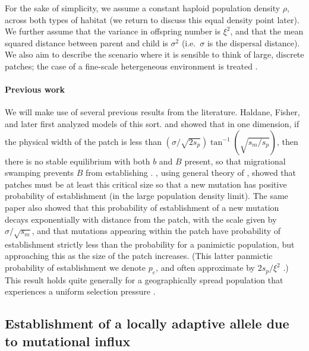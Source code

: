 \documentclass{article}
\begin{document}
For the sake of simplicity, we assume a constant haploid population density $\rho$, 
across both types of habitat (we return to discuss this equal density point later). 
We further assume that the variance in offspring number is $\xi^2$, 
and that the mean squared distance between parent and child is $\sigma^2$
(i.e.\ $\sigma$ is the dispersal distance).
We also aim to describe the scenario where it is sensible to think of large, discrete patches;
the case of a fine-scale hetergeneous environment is treated \citep{elsewhere}.

\paragraph{Previous work} 
We will make use of several previous results from the literature. 
Haldane, Fisher, and later \citet{slatkin1973geneflow} first analyzed models of this sort.
\citet{nagylaki1975conditions} and \citet{conley1975application} showed that in one dimension, if the physical width of the patch is less than $(\sigma/\sqrt{2s_p}) \tan^{-1} (\sqrt{s_m/s_p})$, 
then there is no stable equilibrium with both $b$ and $B$ present,  %
so that migrational swamping prevents $B$ from establishing \citep[see also][ for a review]{lenormand2002limits}.
\citet{barton1987establishment}, using general theory of \citet{pollak1966survival}, showed  
that patches must be at least this critical size so that a new mutation has positive probability of establishment
(in the large population density limit).
The same paper also showed that
this probability of establishment of a new mutation decays exponentially with distance from the patch, 
with the scale given by $\sigma/\sqrt{s_m}$,
and that mutations appearing within the patch have probability of establishment
strictly less than the probability for a panimictic population,
but approaching this as the size of the patch increases.
(This latter panmictic probability of establishment we denote $p_e$,
and often approximate by $2 s_p / \xi^2$ \citep{haldane1927mathematical,fisher1930genetical}.)
This result holds quite generally for a geographically spread population that experiences a uniform selection
pressure \citep{maruyama1970fixation,cherry2003diffusion}. 



\subsection{Establishment of a locally adaptive allele due to mutational influx}
\label{ss:patchymutation}
\end{document}
